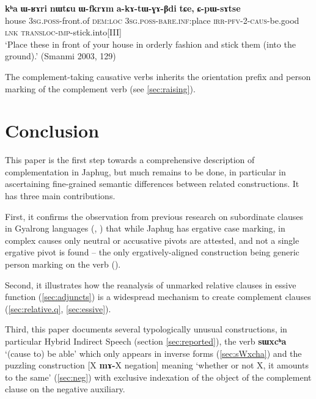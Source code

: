 \documentclass[oneside,a4paper,11pt]{article}
\newcommand{\ipa}[1]{\textbf{\phon#1}} %
\newcommand{\jpg}[2]{\ipa{#1} `#2'} %
\begin{document}
\begin{exe}
\ex \label{ex:akAtWGABdi}
\gll \ipa{kʰa} 	\ipa{ɯ-ʁɤri} 	\ipa{nɯtɕu} 	\ipa{ɯ-fkrɤm} 	\ipa{a-kɤ-tɯ-ɣɤ-βdi} 	\ipa{tɕe,} 	\ipa{ɕ-pɯ-sɤtse} \\
house \textsc{3sg.poss}-front.of \textsc{dem:loc} \textsc{3sg.poss-bare.inf}:place \textsc{irr-pfv-2-caus}-be.good \textsc{lnk} \textsc{transloc-imp}-stick.into[III] \\
\glt `Place these in front of your house in orderly fashion and stick them (into the ground).' (Smanmi 2003, 129)
\end{exe}

The complement-taking causative verbs inherits the orientation prefix and person marking of the complement verb (see \ref{sec:raising}). 

 
  
 \section{Conclusion}
This paper is the first step towards a comprehensive description of complementation in Japhug, but much remains to be done, in particular in ascertaining fine-grained semantic differences between related constructions. It has three main contributions.

First, it confirms the observation from previous research on subordinate clauses in Gyalrong languages (\citealt{jacques16relatives}, \citealt{jackson03caodeng}) that while Japhug has ergative case marking, in complex causes only neutral or accusative pivots are attested, and not a single ergative pivot is found -- the only ergatively-aligned construction being  generic person marking on the verb (\citealt{jacques12demotion}).

Second, it illustrates how the reanalysis of unmarked relative clauses in essive function (\ref{sec:adjuncts}) is a widespread mechanism to create complement clauses (\ref{sec:relative.q}, \ref{sec:essive}).

Third, this paper documents several typologically unusual constructions, in particular Hybrid Indirect Speech (section \ref{sec:reported}), the verb \jpg{sɯxcʰa}{(cause to) be able} which only appears in inverse forms (\ref{sec:sWxcha}) and the puzzling construction  [X \ipa{mɤ-}X negation] meaning `whether or not X, it amounts to the same' (\ref{sec:neg}) with exclusive indexation of the object of the complement clause on the negative auxiliary.



\end{document}
